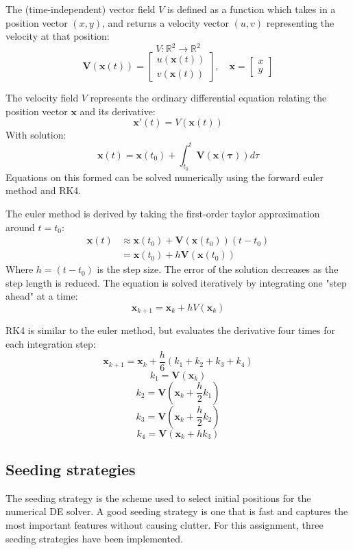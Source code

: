 \documentclass{article}
\begin{document}
The (time-independent) vector field $V$ is defined as a function which takes in a position vector  $(x, y)$, and returns a velocity vector $(u, v)$ representing the velocity at that position:
$$V : \mathbb{R}^2 \rightarrow \mathbb{R}^2 $$
$$\mathbf{V}(\mathbf{x}(t)) = \begin{bmatrix}
    u(\mathbf{x}(t)) \\
    v(\mathbf{x}(t))
\end{bmatrix}, \quad
\mathbf{x} = \begin{bmatrix}
    x\\y
\end{bmatrix}
$$

The velocity field $V$ represents the ordinary differential equation relating 
the position vector $\mathbf{x}$ and its derivative:
$$\mathbf{x}'(t) = V(\mathbf{x}(t))$$
With solution:
$$\mathbf{x}(t) = \mathbf{x}(t_0) + \int_{t_0}^{t} \mathbf{V}(\mathbf{x(\tau)}) d\tau$$
Equations on this formed can be solved numerically using the forward euler method and RK4.

The euler method is derived by taking the first-order taylor approximation around $t = t_0$:
\begin{align*}
    \mathbf{x}(t) &\approx \mathbf{x}(t_0) + \mathbf{V}(\mathbf{x}(t_0))(t-t_0)\\
    &= \mathbf{x}(t_0) + h\mathbf{V}(\mathbf{x}(t_0)) 
\end{align*}
Where $h = (t-t_0)$ is the step size. The error of the solution decreases as the step length is reduced.
The equation is solved iteratively by integrating one "step ahead" at a time:
$$\mathbf{x}_{k+1} = \mathbf{x}_k + hV(\mathbf{x}_k)$$

RK4 is similar to the euler method, but evaluates the derivative four times for each integration step:
$$\mathbf{x}_{k+1} = \mathbf{x}_k + \frac{h}{6}(k_1+k_2+k_3+k_4)$$
$$k_1 = \mathbf{V}(\mathbf{x}_k)$$
$$k_2 = \mathbf{V}\left(\mathbf{x}_k+\frac{h}{2}k_1\right)$$
$$k_3 = \mathbf{V}\left(\mathbf{x}_k+\frac{h}{2}k_2\right)$$
$$k_4 = \mathbf{V}\left(\mathbf{x}_k+hk_3\right)$$

\subsection{Seeding strategies}
The seeding strategy is the scheme used to select initial positions for the numerical DE solver. 
A good seeding strategy is one that is fast and captures the most important features without causing clutter.
For this assignment, three seeding strategies have been implemented.
\end{document}
